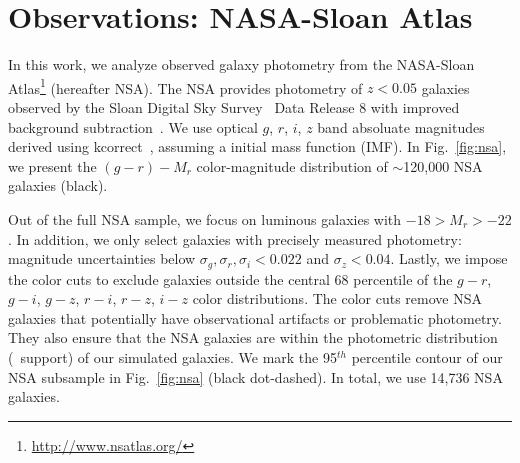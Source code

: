 \section{Observations: NASA-Sloan Atlas}  \label{sec:nsa}
In this work, we analyze observed galaxy photometry from the NASA-Sloan
Atlas\footnote{\url{http://www.nsatlas.org/}} (hereafter NSA).
The NSA provides photometry of $z < 0.05$ galaxies observed by the Sloan
Digital Sky Survey~\citep[SDSS;][]{aihara2011} Data Release 8 with improved
background subtraction~\citep{blanton2011}. 
We use optical $g$, $r$, $i$, $z$ band absoluate magnitudes derived using 
{\sc kcorrect}~\citep{blanton2007}, assuming a
\cite{chabrier2003} initial mass function (IMF). 
In Fig.~\ref{fig:nsa}, we present the $(g - r) - M_r$ color-magnitude
distribution of $\sim$120,000 NSA galaxies (black).

Out of the full NSA sample, we focus on luminous galaxies with 
$-18 > M_r > -22$.
In addition, we only select galaxies with precisely measured photometry: 
magnitude uncertainties below $\sigma_g, \sigma_r, \sigma_i < 0.022$ and 
$\sigma_z < 0.04$. 
Lastly, we impose the color cuts to exclude galaxies outside the central 68
percentile of the $g-r$, $g-i$, $g-z$, $r-i$, $r-z$, $i-z$ color
distributions.
The color cuts remove NSA galaxies that potentially have observational
artifacts or problematic photometry.
They also ensure that the NSA galaxies are within the photometric distribution
(\ie~support) of our simulated galaxies.
We mark the 95$^{th}$ percentile contour of our NSA subsample in
Fig.~\ref{fig:nsa} (black dot-dashed).
In total, we use 14,736 NSA galaxies.


